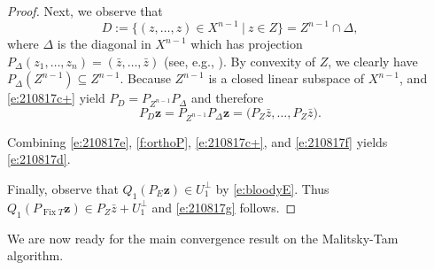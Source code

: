 \documentclass[11pt]{article}
\newcommand{\bz}{\ensuremath{\mathbf{z}}}
\newcommand{\menge}[2]{\big\{{#1}~\big |~{#2}\big\}}
\newcommand{\Fix}{\ensuremath{\operatorname{Fix}}}
\theoremstyle{definition}
\begin{document}
{\begin{proof}
Next, we observe that 
\begin{equation}
\label{e:210817c+}
D := \menge{(z,\ldots,z)\in X^{n-1}}{z\in Z} = 
Z^{n-1}\cap \Delta,
\end{equation}
where $\Delta$ is the diagonal in $X^{n-1}$ which has projection
$P_\Delta(z_1,\ldots,z_n)=(\bar{z},\ldots,\bar{z})$ 
(see, e.g., \cite[Proposition~26.4]{BC2017}). 
By convexity of $Z$, we clearly have 
$P_\Delta(Z^{n-1})\subseteq Z^{n-1}$.
Because $Z^{n-1}$ is a closed linear subspace of $X^{n-1}$,
\cite[Lemma~9.2]{Deutsch} and \cref{e:210817c+} yield
$P_D = P_{Z^{n-1}}P_\Delta$ and therefore
\begin{equation}
\label{e:210817f}
P_D\bz
= P_{Z^{n-1}}P_\Delta\bz
= \big(P_Z\bar{z},\ldots,P_Z\bar{z}\big). 
\end{equation}

Combining \cref{e:210817e}, \cref{f:orthoP}, \cref{e:210817c+},
and \cref{e:210817f} yields \cref{e:210817d}. 

Finally, observe that $Q_1(P_E\bz)\in U_1^\perp$ by 
\cref{e:bloodyE}.
Thus $Q_1(P_{\Fix T}\bz)\in P_Z\bar{z} + U_1^\perp$ 
and \cref{e:210817g} follows.
\end{proof}

We are now ready for the main convergence result on 
the Malitsky-Tam algorithm.

}
\end{document}

